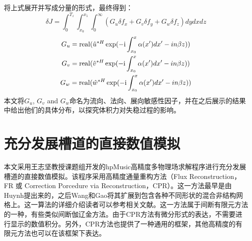 将上式展开并写成分量的形式，最终得到：
\begin{equation}
\label{e:adjointresult}
\delta J = \int_0^{T_z } {\int_{x_0 }^{x_1 } {\int_0^\infty  {\left( {G_u \delta f_x  + G_v \delta f_y  + G_w \delta f_z } \right)dydxdz} } }
\end{equation}
\begin{equation}
\label{e:G}
\begin{gathered}
G_u  = {\rm real}(\hat u^{*H} \exp({ - {\rm i}\int_{x_0 }^x {\alpha (x')dx'}  - in\beta z}) )\\
G_v  = {\rm real}(\hat v^{*H} \exp({ - {\rm i}\int_{x_0 }^x {\alpha (x')dx'}  - in\beta z}) )\\
G_w  = {\rm real}(\hat w^{*H} \exp({ - {\rm i}\int_{x_0 }^x {\alpha (x')dx'}  - in\beta z}) )\\
\end{gathered}
\end{equation}
本文将$G_u$, $G_v$ and $G_w$命名为流向、法向、展向敏感性因子，并在之后展示的结果中给出他们的具体分布，以探究体积力对失稳过程的影响。
\section{充分发展槽道的直接数值模拟}\label{sec:DNS}
本文采用王志坚教授课题组开发的hpMusic高精度多物理场求解程序进行充分发展槽道的直接数值模拟。该程序采用高精度通量重构方法（Flux Reconstruction，FR 或 Correction Porcedure via Reconstruction，CPR）。这一方法最早是由Huynh\cite{Huynh2007}提出来的，之后Wang和Gao\cite{WangGao2009}将其扩展到包含各种不同形状的混合非结构网格上。这一算法的详细介绍读者可以参考相关文献\cite{Vincent2011,Jameson2012,GaoWang2013,Zhu2016,Zh2017}。这一方法属于间断有限元方法的一种，有些类似间断伽辽金方法。由于CPR方法有微分形式的表达，不需要进行显示的数值积分。另外，CPR方法也提供了一种通用的框架，其他高精度的有限元方法也可以在该框架下表达。

